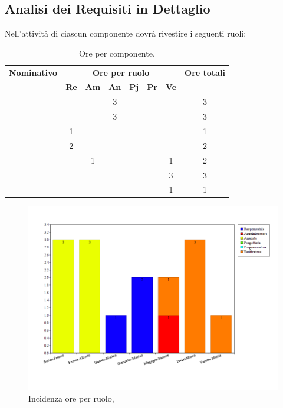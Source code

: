 \subsection{Analisi dei Requisiti in Dettaglio}
Nell'attività di \AD ciascun componente dovrà rivestire i seguenti ruoli:

\begin{table}[H]
	\begin{center}
		\begin{tabular}{|c|c|c|c|c|c|c|c|}
			\hline
			\textbf{Nominativo} & \multicolumn{6}{c|}{\textbf{Ore per ruolo}} & \textbf{Ore totali} \\
			& \textbf{Re} & \textbf{Am} & \textbf{An} & \textbf{Pj} & \textbf{Pr} & \textbf{Ve} & \\
			\hline
			\FB	&		&		&	3	&		&		&		&	3	\\
			\hline
			\AF		&		&		&	3	&	 	&		&		& 	3	\\
			\hline
			\GN		&	1	&		&		&		&		&		&	1	\\
			\hline						
			\GR	&	2	&	 	&	 	&		&	 	& 		&	2	\\
			\hline
			\SM 		&		&	1	&		&		&		& 	1	&	2	\\
			\hline
			\MP		& 		&		&		&		&		&	3	&	3	\\
			\hline						
			\MV 		&		&		&		&		&		&	1	& 	1	\\
			\hline
		\end{tabular}
	\end{center}
	\caption{Ore per componente, \AD}
\end{table}

\begin{figure}[H]
	\centering
	\includegraphics[scale=0.4]{immagini/Grafi/GrafoARD}
	\caption{Incidenza ore per ruolo, \AD}
\end{figure}

